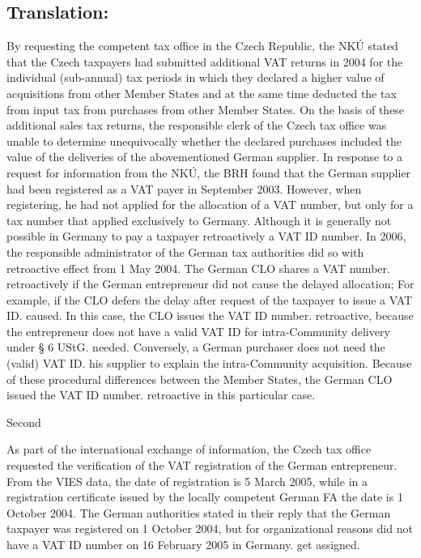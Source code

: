 \documentclass[10pt]{article}
\begin{document}
\pagebreak

\subsection*{Translation:}

By requesting the competent tax office in the Czech Republic, the NKÚ stated that the Czech taxpayers had submitted additional VAT returns in 2004 for the individual (sub-annual) tax periods in which they declared a higher value of acquisitions from other Member States and at the same time deducted the tax from input tax from purchases from other Member States.
On the basis of these additional sales tax returns, the responsible clerk of the Czech tax office was unable to determine unequivocally whether the declared purchases included the value of the deliveries of the abovementioned German supplier.
In response to a request for information from the NKÚ, the BRH found that the German supplier had been registered as a VAT payer in September 2003.
However, when registering, he had not applied for the allocation of a VAT number, but only for a tax number that applied exclusively to Germany.
Although it is generally not possible in Germany to pay a taxpayer retroactively a VAT ID number. In 2006, the responsible administrator of the German tax authorities did so with retroactive effect from 1 May 2004.
The German CLO shares a VAT number. retroactively if the German entrepreneur did not cause the delayed allocation; For example, if the CLO defers the delay after request of the taxpayer to issue a VAT ID. caused.
In this case, the CLO issues the VAT ID number. retroactive, because the entrepreneur does not have a valid VAT ID for intra-Community delivery under § 6 UStG. needed.
Conversely, a German purchaser does not need the (valid) VAT ID. his supplier to explain the intra-Community acquisition.
Because of these procedural differences between the Member States, the German CLO issued the VAT ID number. retroactive in this particular case.


Second

As part of the international exchange of information, the Czech tax office requested the verification of the VAT registration of the German entrepreneur.
From the VIES data, the date of registration is 5 March 2005, while in a registration certificate issued by the locally competent German FA the date is 1 October 2004.
The German authorities stated in their reply that the German taxpayer was registered on 1 October 2004, but for organizational reasons did not have a VAT ID number on 16 February 2005 in Germany. get assigned.
\end{document}
